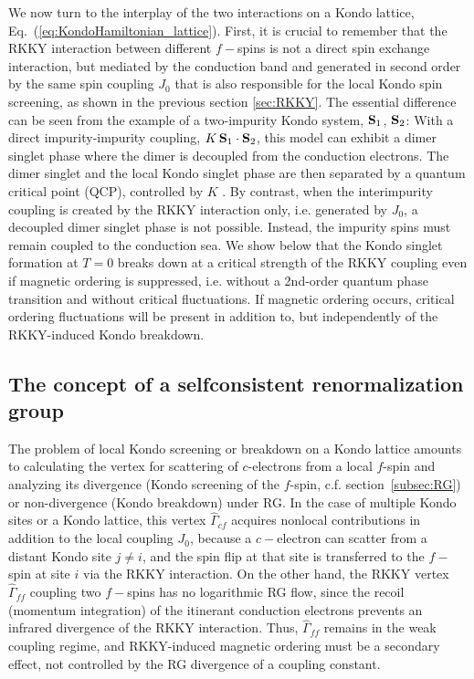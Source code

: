 \documentclass[12pt,twoside]{article}
\newcommand{\Eq}[1]{Eq.~(\ref{#1})}
\begin{document}
We now turn to the interplay of the two interactions on a Kondo lattice, 
\Eq{eq:KondoHamiltonian_lattice}. 
First, it is crucial to remember that the RKKY interaction between 
different $f-$spins is not a direct spin
exchange interaction, but mediated by the conduction band 
\cite{Ruderman54,Kasuya56,Yosida57} and generated in second 
order by the same spin coupling $J_0$ that is also responsible for 
the local Kondo spin screening, as shown in the previous 
section \ref{sec:RKKY}. 
The essential difference can be seen from the example of a 
two-impurity Kondo system, ${\bf S}_1$, ${\bf S}_2$: 
With a direct impurity-impurity coupling, $K\, {\bf S}_1 \cdot {\bf S}_2 $, 
this model can exhibit a dimer singlet phase where the 
dimer is decoupled from the conduction electrons. The dimer singlet and the 
local Kondo singlet phase are then separated by a quantum critical 
point (QCP), controlled by $K$ \cite{Jones88,Affleck95}.   
By contrast, when the interimpurity coupling is created by the RKKY 
interaction only, i.e. generated by $J_0$, a decoupled dimer singlet phase 
is not possible. Instead, the impurity spins must remain coupled to the 
conduction sea. We show below that the Kondo singlet formation at $T=0$ 
breaks down at a critical strength of the RKKY coupling even if magnetic 
ordering is suppressed, i.e. without a 2nd-order quantum phase transition 
and without critical fluctuations. If magnetic ordering occurs, 
critical ordering fluctuations will be present in addition to, 
but independently of the RKKY-induced Kondo breakdown.

\subsection{The concept of a selfconsistent renormalization group}
\label{subsec:Kondo-RKKY_RG}

The problem of local Kondo screening or breakdown 
on a Kondo lattice amounts to calculating the 
vertex for scattering of $c$-electrons from a local $f$-spin and analyzing 
its divergence (Kondo screening of the $f$-spin, c.f. 
section~\ref{subsec:RG}) or non-divergence (Kondo breakdown) under RG.
In the case of multiple Kondo sites or a Kondo lattice, this vertex
$\hat\Gamma_{cf}$ acquires nonlocal contributions in addition to the 
local coupling $J_0$, because a $c-$electron can scatter 
from a distant Kondo site $j\neq i$, and the spin flip at that site is 
transferred to the $f-$spin at site $i$ via the RKKY interaction.
On the other hand, the RKKY vertex $\hat\Gamma_{ff}$ coupling two $f-$spins 
has no logarithmic RG flow, since the recoil (momentum integration) 
of the itinerant conduction electrons prevents an infrared divergence 
of the RKKY interaction. Thus, $\hat\Gamma_{ff}$ remains in the weak 
coupling regime, and RKKY-induced magnetic ordering must be a secondary 
effect, not controlled by the RG divergence of a coupling constant. 
\end{document}
